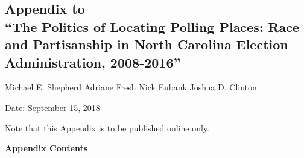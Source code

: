 \documentclass[12pt]{article}
\begin{document}
\begin{centering}

\section*{\normalfont \LARGE Appendix to \\``The Politics of Locating Polling Places: Race and Partisanship in North Carolina Election Administration, 2008-2016''}
\vspace*{-0.5cm}


	\vspace{.15in} \large
	Michael E. Shepherd \hspace*{.2in} Adriane Fresh  \hspace*{.2in} Nick Eubank \hspace*{.2in} Joshua D. Clinton



\large
\vspace{.2in}
Date: September 15, 2018


\large
\vspace{.2in}

\normalsize
\vspace*{.2in}
Note that this Appendix is to be published online only.

\end{centering}


\setcounter{footnote}{0}
\setcounter{equation}{0}
\setcounter{page}{1}

\renewcommand{\thesubsection}{\Alph{subsection}}




\newpage
\vspace{.2in}
\noindent \textbf{Appendix Contents}
\end{document}
